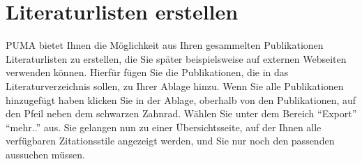 \documentclass[a4paper,11pt,twoside]{scrbook}
\begin{document}
\section{Literaturlisten erstellen}
PUMA bietet Ihnen die Möglichkeit aus Ihren gesammelten Publikationen Literaturlisten zu erstellen, die Sie später beispielsweise auf externen Webseiten verwenden können. \newline
Hierfür fügen Sie die Publikationen, die in das Literaturverzeichnis sollen, zu Ihrer Ablage hinzu. Wenn Sie alle Publikationen hinzugefügt haben klicken Sie in der Ablage, oberhalb von den Publikationen, auf den Pfeil neben dem schwarzen Zahnrad. Wählen Sie unter dem Bereich \enquote{Export} \enquote{mehr..} aus. Sie gelangen nun zu einer Übersichtsseite, auf der Ihnen alle verfügbaren Zitationsstile angezeigt werden, und Sie nur noch den passenden aussuchen müssen. 
\end{document}
